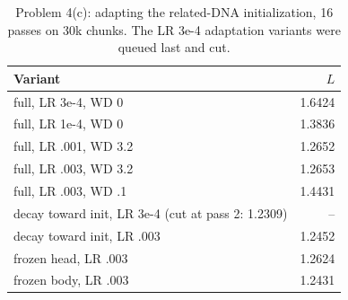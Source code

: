 \begin{table}[H]\centering\small\caption{Problem 4(c): adapting the related-DNA initialization, 16 passes on 30k chunks. The LR 3e-4 adaptation variants were queued last and cut.}\label{tab:p4c}
\begin{tabular}{lr}\toprule Variant & $L$ \\ \midrule
full, LR 3e-4, WD 0 & 1.6424 \\
full, LR 1e-4, WD 0 & 1.3836 \\
full, LR .001, WD 3.2 & 1.2652 \\
full, LR .003, WD 3.2 & 1.2653 \\
full, LR .003, WD .1 & 1.4431 \\
decay toward init, LR 3e-4 (cut at pass 2: 1.2309) & -- \\
decay toward init, LR .003 & 1.2452 \\
frozen head, LR .003 & 1.2624 \\
frozen body, LR .003 & 1.2431 \\
\bottomrule\end{tabular}\end{table}

